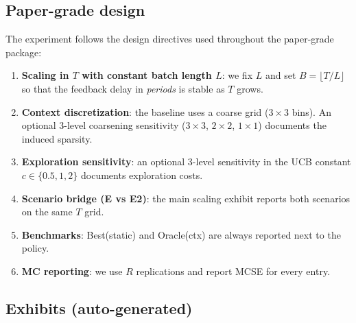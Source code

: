 \subsection{Paper-grade design}
The experiment follows the design directives used throughout the paper-grade package:
\begin{enumerate}
\item \textbf{Scaling in $T$ with constant batch length $L$}: we fix $L$ and set $B=\lfloor T/L\rfloor$ so that the feedback delay in \emph{periods} is stable as $T$ grows.
\item \textbf{Context discretization}: the baseline uses a coarse grid ($3\times 3$ bins). An optional 3-level coarsening sensitivity ($3\times 3$, $2\times 2$, $1\times 1$) documents the induced sparsity.
\item \textbf{Exploration sensitivity}: an optional 3-level sensitivity in the UCB constant $c\in\{0.5,1,2\}$ documents exploration costs.
\item \textbf{Scenario bridge (E vs E2)}: the main scaling exhibit reports both scenarios on the same $T$ grid.
\item \textbf{Benchmarks}: Best(static) and Oracle(ctx) are always reported next to the policy.
\item \textbf{MC reporting}: we use $R$ replications and report MCSE for every entry.
\end{enumerate}

\subsection{Exhibits (auto-generated)}


